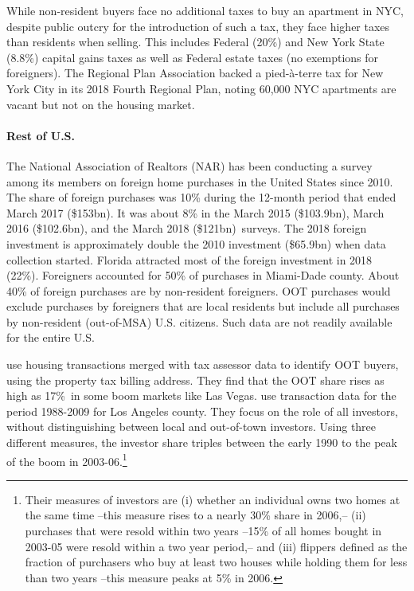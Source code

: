 \documentclass[letterpaper,12pt,dvipsnames,usenames]{article}
\theoremstyle{definition}
\begin{document}
\begin{spacing}{1.25}
While non-resident buyers face no additional taxes to buy an apartment in NYC, despite public outcry for the introduction of such a tax, they face higher taxes than residents when selling. This includes Federal (20\%) and New York State (8.8\%) capital gains taxes as well as Federal estate taxes (no exemptions for foreigners). The Regional Plan Association backed a pied-\`a-terre tax for New York City in its 2018 Fourth Regional Plan, noting 60,000 NYC apartments are vacant but not on the housing market.

\paragraph{Rest of U.S.} The National Association of Realtors (NAR) has been conducting a  survey among its members on foreign home purchases in the United States since 2010. The share of foreign purchases was 10\% during the 12-month period that ended March 2017 (\$153bn). It was about 8\% in  the March 2015 (\$103.9bn), March 2016 (\$102.6bn), and the March 2018 (\$121bn)\ surveys. The 2018 foreign investment is approximately double the 2010 investment (\$65.9bn) when data collection started. Florida attracted most of the foreign investment in 2018 (22\%). Foreigners accounted for 50\% of purchases in Miami-Dade county. About 40\% of foreign purchases are by non-resident foreigners. OOT purchases would exclude  purchases by foreigners that are local residents but include all purchases by non-resident (out-of-MSA) U.S. citizens. Such data are not readily available for the entire U.S.

\citet{chincomayer:16} use housing transactions merged with tax assessor data to identify OOT buyers, using the property tax billing address. They find that the OOT share rises as high as 17\%\ in some boom markets like Las Vegas. \citet{bayerspec:11} use transaction data for the period 1988-2009 for Los Angeles county. They focus on the role of all investors, without distinguishing between local and out-of-town investors. Using three different measures, the investor share triples between the early 1990 to the peak of the boom in 2003-06.\footnote{Their measures of investors are (i) whether an individual owns two homes at the same time --this measure rises to a nearly 30\% share in 2006,-- (ii) purchases that were resold within two years --15\% of all homes bought in 2003-05 were resold within a two year period,-- and (iii) flippers defined as the fraction of purchasers who buy at least two houses while holding them for less than two years --this measure peaks at 5\% in 2006.}


\end{spacing}
\end{document}
